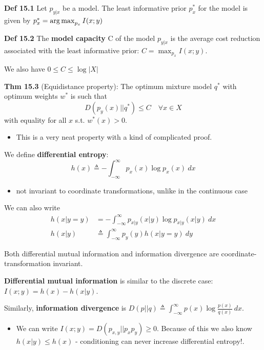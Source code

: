 \documentclass[12pt]{article} %
\begin{document}
\textbf{Def 15.1} Let $p_{y|x}$ be a model. The least informative prior $p_x^*$ for the model is given by $p_x^* = \operatorname*{arg\,max}_{p_x} I(x;y)$

\textbf{Def 15.2} The \textbf{model capacity} C of the model $p_{y|x}$ is the average cost reduction associated with the least informative prior: $C = \max_{p_x} I(x;y)$.

We also have $0 \leq C \leq \log |X|$

\textbf{Thm 15.3} (Equidistance property): The optimum mixture model $q^*$ with optimum weights $w^*$ is such that
\begin{equation*}
    D(p_y(x)||q^*) \leq C \quad \forall x \in X
\end{equation*}
with equality for all $x$ s.t. $w^*(x) > 0$.
\begin{itemize}[topsep=-1pt, itemsep=-1pt]
    \item 
This is a very neat property with a kind of complicated proof.
\end{itemize}



\newpage
{}
We define \textbf{differential entropy}:
\begin{equation*}
    h(x) \triangleq 
    - \int_{-\infty}^{\infty} p_x(x) \log p_x(x) \ dx
\end{equation*}
\begin{itemize}[topsep=-1pt, itemsep=-1pt]
    \item 
not invariant to coordinate transformations, unlike in the continuous case
\end{itemize}
We can also write
\begin{align*}
    h(x|y=y) 
    &= 
    - \int_{-\infty}^{\infty} p_{x|y}(x|y) \log p_{x|y}(x|y) \ dx \\
    h(x|y)
    &\triangleq
    \int_{-\infty}^{\infty} p_y(y) h(x|y=y) \ dy
\end{align*}

Both differential mutual information and information divergence are coordinate-transformation invariant.

\textbf{Differential mutual information} is similar to the discrete case: $I(x;y) = h(x) - h(x|y)$.

Similarly, \textbf{information divergence} is $D(p||q) \triangleq \int_{-\infty}^{\infty} p(x) \log \frac{p(x)}{q(x)}\ dx$.
\begin{itemize}[topsep=-1pt, itemsep=-1pt]
    \item
We can write $I(x;y) = D(p_{x,y} || p_xp_y) \geq 0$. Because of this we also know $h(x|y) \leq h(x)$ - conditioning can never increase differential entropy!.
\end{itemize}
\end{document}

